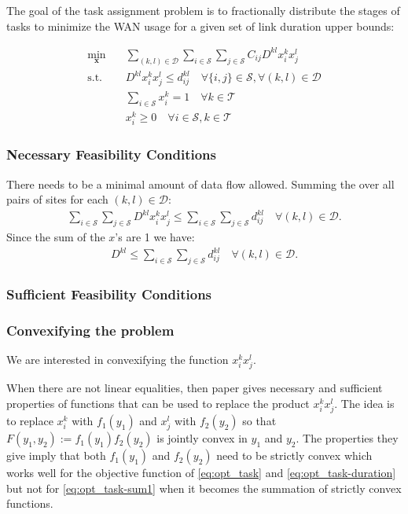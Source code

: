 The goal of the task assignment problem is to fractionally distribute the stages of tasks to minimize the WAN usage for a given set of link duration upper bounds:

\begin{subequations}\label{eq:opt_task}
	\begin{align}
		\min_{\mathbf{x}} \quad & \sum_{(k,l)\in\mathcal{D}}\sum_{i\in\mathcal{S}}\sum_{j\in\mathcal{S}}C_{ij}D^{kl}x_i^kx_j^l \nonumber \\
		\text{s.t.}\quad & D^{kl}x_i^kx_j^l \leq d_{ij}^{kl} \quad \forall\{i,j\}\in\mathcal{S}, \forall(k,l)\in\mathcal{D} \label{eq:opt_task-duration} \\
		& \sum_{i\in\mathcal{S}}x_i^k = 1 \quad \forall k\in\mathcal{T} \label{eq:opt_task-sum1} \\
		& x_i^k \geq 0 \quad \forall i\in\mathcal{S},k\in\mathcal{T} \label{eq:opt_task-nonneg}
	\end{align}
\end{subequations}

\subsubsection{Necessary Feasibility Conditions} There needs to be a minimal amount of data flow allowed. Summing the over all pairs of sites for each $(k,l)\in\mathcal{D}$:
\begin{align}
	\sum_{i\in\mathcal{S}}\sum_{j\in\mathcal{S}}D^{kl}x_i^kx_j^l \leq \sum_{i\in\mathcal{S}}\sum_{j\in\mathcal{S}}d_{ij}^{kl} \quad\forall (k,l)\in\mathcal{D}. \nonumber
\end{align}
Since the sum of the $x$'s are 1 we have:
\begin{align}
	D^{kl} \leq \sum_{i\in\mathcal{S}}\sum_{j\in\mathcal{S}}d_{ij}^{kl} \quad\forall (k,l)\in\mathcal{D}.
\end{align}

\subsubsection{Sufficient Feasibility Conditions} \todo{}

\subsubsection{Convexifying the problem}

We are interested in convexifying the function $x_i^kx_j^l$.

When there are not linear equalities, then paper \cite{gounaris2008convexity} gives necessary and sufficient properties of functions that can be used to replace the product $x_i^kx_j^l$.
The idea is to replace $x_i^k$ with $f_1(y_1)$ and $x_j^l$ with $f_2(y_2)$ so that $F(y_1,y_2):=f_1(y_1)f_2(y_2)$ is jointly convex in $y_1$ and $y_2$.
The properties they give imply that both $f_1(y_1)$ and $f_2(y_2)$ need to be strictly convex which works well for the objective function of \eqref{eq:opt_task} and \eqref{eq:opt_task-duration} but not for \eqref{eq:opt_task-sum1} when it becomes the summation of strictly convex functions.


